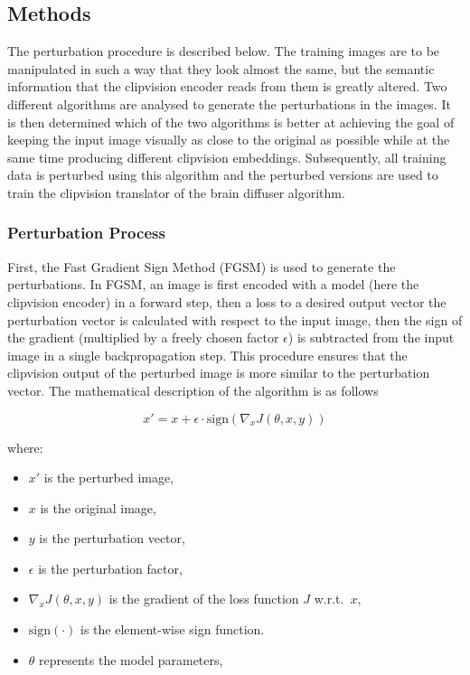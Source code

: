 \subsection{Methods}

The perturbation procedure is described below. The training images are to be manipulated in such a way that they look almost the same, but the semantic information that the clipvision encoder reads from them is greatly altered. Two different algorithms are analysed to generate the perturbations in the images. It is then determined which of the two algorithms is better at achieving the goal of keeping the input image visually as close to the original as possible while at the same time producing different clipvision embeddings. Subsequently, all training data is perturbed using this algorithm and the perturbed versions are used to train the clipvision translator of the brain diffuser algorithm.

\subsubsection{Perturbation Process}

First, the Fast Gradient Sign Method\cite{goodfellowExplainingHarnessingAdversarial2014} (FGSM) is used to generate the perturbations. In FGSM, an image is first encoded with a model (here the clipvision encoder) in a forward step, then a loss to a desired output vector the perturbation vector is calculated with respect to the input image, then the sign of the gradient (multiplied by a freely chosen factor $\epsilon$) is subtracted from the input image in a single backpropagation step. This procedure ensures that the clipvision output of the perturbed image is more similar to the perturbation vector. The mathematical description of the algorithm is as follows

\[
x' = x + \epsilon \cdot \text{sign}(\nabla_x J(\theta, x, y))
\]

where:
\begin{itemize}
    \item \( x' \) is the perturbed image,
    \item \( x \) is the original image,
    \item \( y \) is the perturbation vector,
    \item \( \epsilon \) is the perturbation factor,
    \item \( \nabla_x J(\theta, x, y) \) is the gradient of the loss function \( J \) w.r.t.\ \( x \),
    \item \( \text{sign}(\cdot) \) is the element-wise sign function.
    \item \( \theta \) represents the model parameters,
\end{itemize}

